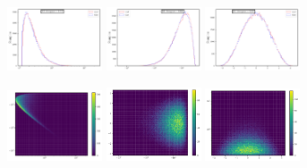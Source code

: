 \documentclass[twocolumn,preprintnumbers,superscriptaddress]{revtex4-2}
\begin{document}
\begin{figure}
  \includegraphics[width=0.25\textwidth]{plots/LHCttbar/s-distribution_100000_100_3_5_4_10000_128_0.5.pdf}%
  \includegraphics[width=0.25\textwidth]{plots/LHCttbar/t-distribution_100000_100_3_5_4_10000_128_0.5.pdf}%
  \includegraphics[width=0.25\textwidth]{plots/LHCttbar/y-distribution_100000_100_3_5_4_10000_128_0.5.pdf}

  \includegraphics[width=0.25\textwidth]{plots/LHCttbar/s-t_REAL_100000_100.pdf}%
  \includegraphics[width=0.25\textwidth]{plots/LHCttbar/t-y_REAL_100000_100.pdf}%
  \includegraphics[width=0.25\textwidth]{plots/LHCttbar/y-s_REAL_100000_100.pdf}


\end{figure}
\end{document}
